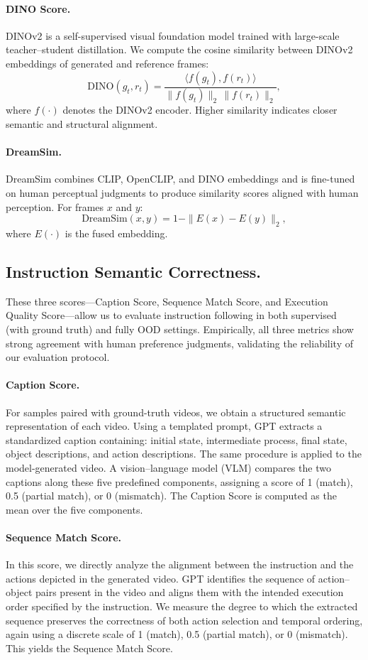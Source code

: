 \paragraph{DINO Score.}
DINOv2 is a self-supervised visual foundation model trained with large-scale teacher--student distillation. 
We compute the cosine similarity between DINOv2 embeddings of generated and reference frames:
\[
\mathrm{DINO}(g_t, r_t)
= \frac{\langle f(g_t), f(r_t) \rangle}
       {\|f(g_t)\|_2 \, \|f(r_t)\|_2},
\]
where $f(\cdot)$ denotes the DINOv2 encoder. Higher similarity indicates closer semantic and structural alignment.

\paragraph{DreamSim.}
DreamSim combines CLIP, OpenCLIP, and DINO embeddings and is fine-tuned on human perceptual judgments to produce similarity scores aligned with human perception. For frames $x$ and $y$:
\[
\mathrm{DreamSim}(x,y) 
= 1 - \| E(x) - E(y) \|_2,
\]
where $E(\cdot)$ is the fused embedding.

\subsection{Instruction Semantic Correctness.}
These three scores—Caption Score, Sequence Match Score, and Execution Quality Score—allow us to evaluate instruction following in both supervised (with ground truth) and fully OOD settings. Empirically, all three metrics show strong agreement with human preference judgments, validating the reliability of our evaluation protocol.

\paragraph{Caption Score.}
For samples paired with ground-truth videos, we obtain a structured semantic representation of each video.
Using a templated prompt, GPT extracts a standardized caption containing: initial state, intermediate process, final state, object descriptions, and action descriptions.
The same procedure is applied to the model-generated video.
A vision–language model (VLM) compares the two captions along these five predefined components, assigning a score of 1 (match), 0.5 (partial match), or 0 (mismatch).
The Caption Score is computed as the mean over the five components.

\paragraph{Sequence Match Score.}
In this score, we directly analyze the alignment between the instruction and the actions depicted in the generated video.
GPT identifies the sequence of action–object pairs present in the video and aligns them with the intended execution order specified by the instruction.
We measure the degree to which the extracted sequence preserves the correctness of both action selection and temporal ordering, again using a discrete scale of 1 (match), 0.5 (partial match), or 0 (mismatch).
This yields the Sequence Match Score.

